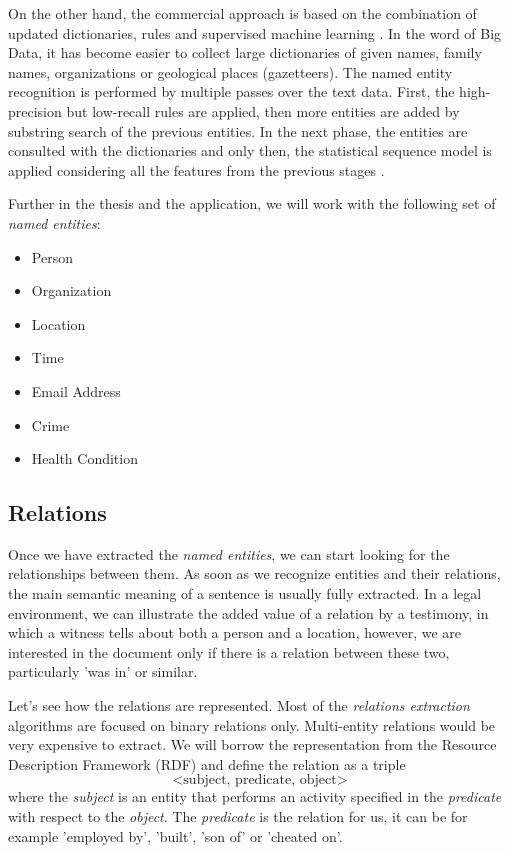 \documentclass[
  digital, %
  table,   %
  lof,     %
  lot,     %
]{fithesis3}
\begin{document}
On the other hand, the commercial approach is based on the combination of updated dictionaries, rules and supervised machine learning \cite{chiticariu2013rule}.
In the word of Big Data, it has become easier to collect large dictionaries of given names, family names, organizations or geological places (gazetteers).
The named entity recognition is performed by multiple passes over the text data.
First, the high-precision but low-recall rules are applied, then more entities are added by substring search of the previous entities.
In the next phase, the entities are consulted with the dictionaries and only then, the statistical sequence model is applied considering all the features from the previous stages \cite[ch. 21]{jurafsky2014speech}.

Further in the thesis and the application, we will work with the following set of \textit{named entities}:
\begin{itemize}
\item Person
\item Organization
\item Location
\item Time
\item Email Address
\item Crime
\item Health Condition
\end{itemize}

\subsection{Relations}
Once we have extracted the \textit{named entities}, we can start looking for the relationships between them.
As soon as we recognize entities and their relations, the main semantic meaning of a sentence is usually fully extracted.
In a legal environment, we can illustrate the added value of a relation by a testimony, in which a witness tells about both a person and a location, however, we are interested in the document only if there is a relation between these two, particularly 'was in' or similar.

Let's see how the relations are represented.
Most of the \textit{relations extraction} algorithms are focused on binary relations only.
Multi-entity relations would be very expensive to extract.
We will borrow the representation from the Resource Description Framework (RDF) \cite{lassila1999resource} and define the relation as a triple
$$
\text{<subject, predicate, object>}
$$
where the \textit{subject} is an entity that performs an activity specified in the \textit{predicate} with respect to the \textit{object}.
The \textit{predicate} is the relation for us, it can be for example 'employed by', 'built', 'son of' or 'cheated on'.
\end{document}
